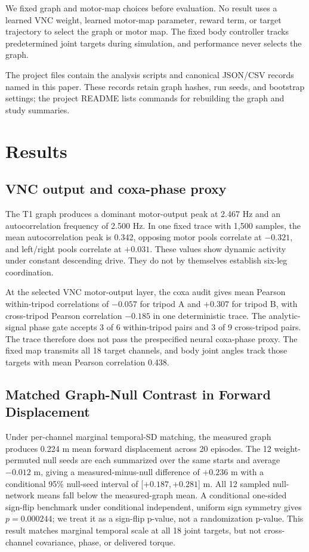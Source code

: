 \documentclass[conference]{IEEEtran}
\begin{document}
We fixed graph and motor-map choices before evaluation. No result uses a learned VNC weight, learned motor-map parameter, reward term, or target trajectory to select the graph or motor map. The fixed body controller tracks predetermined joint targets during simulation, and performance never selects the graph.

The project files contain the analysis scripts and canonical JSON/CSV records named in this paper. These records retain graph hashes, run seeds, and bootstrap settings; the project README lists commands for rebuilding the graph and study summaries.

\section{Results}
\label{sec:results}
\subsection{VNC output and coxa-phase proxy}
The T1 graph produces a dominant motor-output peak at 2.467 Hz and an autocorrelation frequency of 2.500 Hz. In one fixed trace with 1,500 samples, the mean autocorrelation peak is 0.342, opposing motor pools correlate at $-0.321$, and left/right pools correlate at $+0.031$. These values show dynamic activity under constant descending drive. They do not by themselves establish six-leg coordination.

At the selected VNC motor-output layer, the coxa audit gives mean Pearson within-tripod correlations of $-0.057$ for tripod A and $+0.307$ for tripod B, with cross-tripod Pearson correlation $-0.185$ in one deterministic trace. The analytic-signal phase gate accepts 3 of 6 within-tripod pairs and 3 of 9 cross-tripod pairs. The trace therefore does not pass the prespecified neural coxa-phase proxy. The fixed map transmits all 18 target channels, and body joint angles track those targets with mean Pearson correlation 0.438.

\subsection{Matched Graph-Null Contrast in Forward Displacement}
Under per-channel marginal temporal-SD matching, the measured graph produces 0.224 m mean forward displacement across 20 episodes. The 12 weight-permuted null seeds are each summarized over the same starts and average $-0.012$ m, giving a measured-minus-null difference of $+0.236$ m with a conditional 95\% null-seed interval of [$+0.187,+0.281$] m. All 12 sampled null-network means fall below the measured-graph mean. A conditional one-sided sign-flip benchmark under conditional independent, uniform sign symmetry gives $p=0.000244$; we treat it as a sign-flip p-value, not a randomization p-value. This result matches marginal temporal scale at all 18 joint targets, but not cross-channel covariance, phase, or delivered torque.
\end{document}
